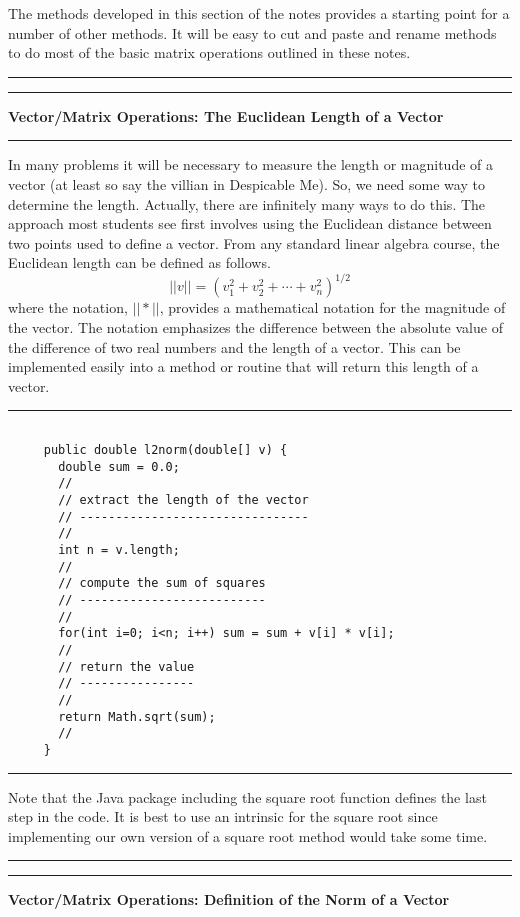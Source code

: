 \documentclass[10pt,fleqn]{article}
\begin{document}
The methods developed in this section of the notes provides a starting point for
a number of other methods. It will be easy to cut and paste and rename methods
to do most of the basic matrix operations outlined in these notes.
\vskip0.1in\hrule\vskip0.1in
\newpage
\vskip0.1in\hrule\vskip0.1in
\noindent
{\bf Vector/Matrix Operations: The Euclidean Length of a Vector}
\vskip0.1in\hrule\vskip0.1in
\noindent
In many problems it will be necessary to measure the length or magnitude of a
vector (at least so say the villian in Despicable Me). So, we need some way to
determine the length. Actually, there are infinitely many ways to do this. The
approach most students see first involves using the Euclidean distance between
two points used to define a vector. From any standard linear algebra course, the
Euclidean length can be defined as follows.
$$
  || v || = ( v_1^2 + v_2^2 + \cdots + v_n^2 )^{1/2}
$$
where the notation, $||*||$, provides a mathematical notation for the magnitude
of the vector. The notation emphasizes the difference between the absolute 
value of the difference of two real numbers and the length of a vector. This can
be implemented easily into a method or routine that will return this length of a
vector.
\vskip0.1in\hrule\vskip0.1in
\begin{verbatim}

     public double l2norm(double[] v) {
       double sum = 0.0;
       //
       // extract the length of the vector
       // --------------------------------
       //
       int n = v.length;
       //
       // compute the sum of squares
       // --------------------------
       //
       for(int i=0; i<n; i++) sum = sum + v[i] * v[i];
       //
       // return the value
       // ----------------
       //
       return Math.sqrt(sum);
       //
     }

\end{verbatim}
\vskip0.1in\hrule\vskip0.1in
Note that the Java package including the square root function defines the last
step in the code. It is best to use an intrinsic for the square root since
implementing our own version of a square root method would take some time.
\vskip0.1in\hrule\vskip0.1in
\newpage
\vskip0.1in\hrule\vskip0.1in
\noindent
{\bf Vector/Matrix Operations: Definition of the Norm of a Vector}
\end{document}
